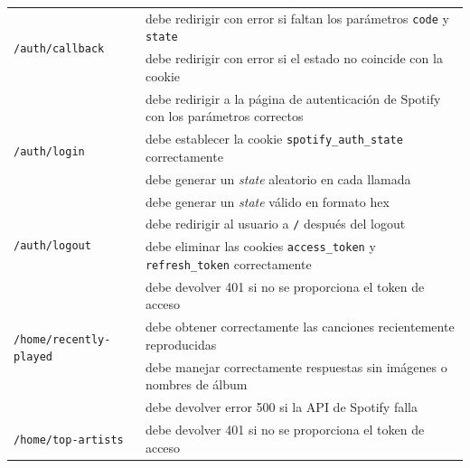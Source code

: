 \begin{longtable}{|p{5cm}|p{9cm}|}
    \multirow{2}{*}{\texttt{/auth/callback}}              & debe redirigir con error si faltan los parámetros \texttt{code} y \texttt{state}         \\ \cline{2-2}
                                                          & debe redirigir con error si el estado no coincide con la cookie                          \\ \hline
    \multirow{4}{*}{\texttt{/auth/login}}                 & debe redirigir a la página de autenticación de Spotify con los parámetros correctos      \\ \cline{2-2}
                                                          & debe establecer la cookie \texttt{spotify\_auth\_state} correctamente                    \\ \cline{2-2}
                                                          & debe generar un \textit{state} aleatorio en cada llamada                                 \\ \cline{2-2}
                                                          & debe generar un \textit{state} válido en formato hex                                     \\ \hline
    \multirow{2}{*}{\texttt{/auth/logout}}                & debe redirigir al usuario a \texttt{/} después del logout                                \\ \cline{2-2}
                                                          & debe eliminar las cookies \texttt{access\_token} y \texttt{refresh\_token} correctamente \\ \hline
    \multirow{4}{*}{\texttt{/home/recently-played}}       & debe devolver 401 si no se proporciona el token de acceso                                \\ \cline{2-2}
                                                          & debe obtener correctamente las canciones recientemente reproducidas                      \\ \cline{2-2}
                                                          & debe manejar correctamente respuestas sin imágenes o nombres de álbum                    \\ \cline{2-2}
                                                          & debe devolver error 500 si la API de Spotify falla                                       \\ \hline
    \multirow{5}{*}{\texttt{/home/top-artists}}           & debe devolver 401 si no se proporciona el token de acceso                                \\ \cline{2-2}

\end{longtable}
